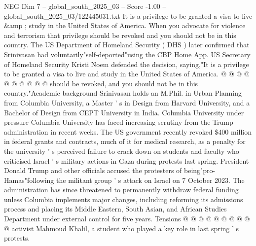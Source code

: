 \begin{textsample}{NEG Dim 7 – global\_south\_2025\_03 – Score -1.00 – global\_south\_2025\_03/122445031.txt}
It is a privilege to be granted a visa to live \&amp ; study in the United States of America.
When you advocate for violence and terrorism that privilege should be revoked and you should not be in this country.
The US Department of Homeland Security ( DHS ) later confirmed that Srinivasan had voluntarily"self-deported"using the CBP Home App.
US Secretary of Homeland Security Kristi Noem defended the decision, saying,"It is a privilege to be granted a visa to live and study in the United States of America. @ @ @ @ @ @ @ @ @ @ should be revoked, and you should not be in this country."Academic background Srinivasan holds an M.Phil. in Urban Planning from Columbia University, a Master ' s in Design from Harvard University, and a Bachelor of Design from CEPT University in India.
Columbia University under pressure Columbia University has faced increasing scrutiny from the Trump administration in recent weeks.
The US government recently revoked \$400 million in federal grants and contracts, much of it for medical research, as a penalty for the university ' s perceived failure to crack down on students and faculty who criticised Israel ' s military actions in Gaza during protests last spring.
President Donald Trump and other officials accused the protesters of being"pro-Hamas"following the militant group ' s attack on Israel on 7 October 2023.
The administration has since threatened to permanently withdraw federal funding unless Columbia implements major changes, including reforming its admissions process and placing its Middle Eastern, South Asian, and African Studies Department under external control for five years.
Tensions @ @ @ @ @ @ @ @ @ @ activist Mahmoud Khalil, a student who played a key role in last spring ' s protests.

\end{textsample}
